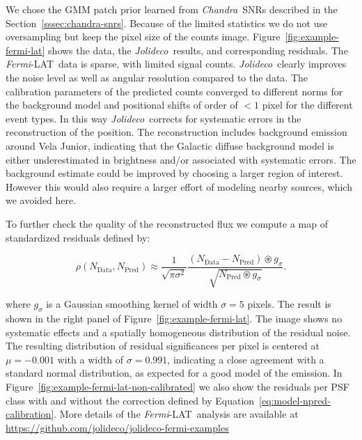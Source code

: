 \documentclass[twocolumn]{aastex631}
\newcommand{\chandra}{\textit{Chandra}~}
\newcommand{\fermi}{\textit{Fermi}-LAT~}
\newcommand{\jolideco}{\textit{Jolideco}~}
\begin{document}
    We chose the GMM patch prior learned from \chandra SNRs described in the Section~\ref{sssec:chandra-snrs}. Because of the limited statistics we do not use oversampling but keep the pixel size of the counts image. Figure~\ref{fig:example-fermi-lat} shows the data,  the \jolideco results, and corresponding residuals. The \fermi data is sparse, with limited signal counts. \jolideco clearly improves the noise level as well as angular resolution compared to the data. The calibration parameters of the predicted counts converged to different norms for the background model and positional shifts of order of $<1$ pixel for the different event types. In this way \jolideco corrects for systematic errors in the reconstruction of the position. The reconstruction includes background emission around Vela Junior, indicating that the Galactic diffuse background model is either underestimated in brightness and/or associated with systematic errors. The background estimate could be improved by choosing a larger region of interest. However this would also require a larger effort of modeling nearby sources, which we avoided here.
    
    To further check the quality of the reconstructed flux we compute a map of standardized residuals defined by:

    \begin{equation}
        \label{eq:approx-sigma}
        \rho(N_{\mathrm{Data}}, N_{\mathrm{Pred}}) \approx \frac{1}{\sqrt{\pi \sigma^2}}\frac{(N_{\mathrm{Data}} - N_{\mathrm{Pred}}) \circledast g_{\sigma}} {\sqrt{N_{\mathrm{Pred}}\circledast g_{\sigma}}}.
    \end{equation}
    
    where $g_{\sigma}$ is a Gaussian smoothing kernel of width $\sigma=5$ pixels. The result is shown in the right panel of Figure~\ref{fig:example-fermi-lat}. The image shows no systematic effects and a spatially homogeneous distribution of the residual noise. The resulting distribution of residual significances per pixel is centered at $\mu=-0.001$ with a width of $\sigma=0.991$, indicating a close agreement with a standard normal distribution, as expected for a good model of the emission. In Figure~\ref{fig:example-fermi-lat-non-calibrated} we also show the residuals per PSF class with and without the correction defined by Equation~\ref{eq:model-npred-calibration}. More details of the \fermi analysis are available at \url{https://github.com/jolideco/jolideco-fermi-examples}
    
\end{document}
